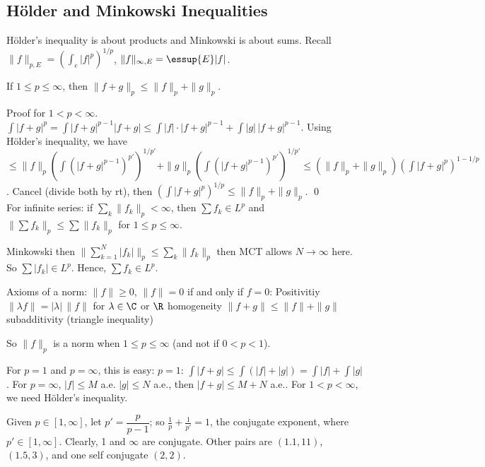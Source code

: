 \subsection{H\"older and Minkowski Inequalities}


H\"older's inequality is about products and Minkowski is about sums. Recall $\|f\|_{p,E}= \left( \int_e |f|^p \right)^{1/p}$, $\|f\|_{\infty,E}= \essup{E} |f|$. 


\begin{thm}
If $1 \leq p \leq \infty$, then $\|f+g\|_p \leq \|f\|_p + \|g\|_p$. 
\end{thm}

\pf Proof for $1<p<\infty$. $\int |f+g|^p= \int |f+g|^{p-1} |f+g| \leq \int |f| \cdot |f+g|^{p-1} + \int |g| \, |f+g|^{p-1}$. Using H\"older's inequality, we have $\leq \|f\|_p \left( \int (|f+g|^{p-1})^{p'} \right)^{1/p'} + \|g\|_p \left( \int (|f+g|^{p-1})^{p'}\right)^{1/p'} \leq (\|f\|_p + \|g\|_p) \left( \int |f+g|^p \right)^{1-1/p}$. Cancel (divide both by rt), then $\left( \int |f+g|^p \right)^{1/p} \leq \|f\|_p + \|g\|_p$. \qed \\


For infinite series: if $\sum_k \|f_k\|_p < \infty$, then $\sum f_k \in L^p$ and $\| \sum f_k \|_p \leq \sum \|f_k\|_p$ for $1 \leq p \leq \infty$. 

\pf Minkowski then $\| \sum_{k=1}^N |f_k|\|_p \leq \sum_k \|f_k\|_p$ then MCT allows $N \to \infty$ here. So $\sum |f_k| \in L^p$. Hence, $\sum f_k \in L^p$.




Axioms of a norm: 
$\|f\| \geq 0$, $\|f\|=0$ if and only if $f=0$: Positivitiy
$\|\lambda f\|= |\lambda| \, \|f\|$ for $\lambda \in \C$ or $\R$ homogeneity
$\|f+g\| \leq \|f\|+\|g\|$ subadditivity (triangle inequality)

So $\|f\|_p$ is a norm when $1 \leq p \leq \infty$ (and not if $0<p<1$). 

For $p=1$ and $p= \infty$, this is easy: $p=1$: $\int |f+g| \leq \int (|f|+|g|)= \int |f|+ \int |g|$. For $p=\infty$, $|f| \leq M$ a.e. $|g| \leq N$ a.e., then $|f+g| \leq M+N$ a.e.. For $1<p<\infty$, we need H\"older's inequality. 


Given $p \in [1,\infty]$, let $p' = \dfrac{p}{p-1}$; so $\frac{1}{p} + \frac{1}{p'}=1$, the conjugate exponent, where $p' \in [1,\infty]$. Clearly, 1 and $\infty$ are conjugate. Other pairs are $(1.1,11)$, $(1.5,3)$, and one self conjugate $(2,2)$. 

